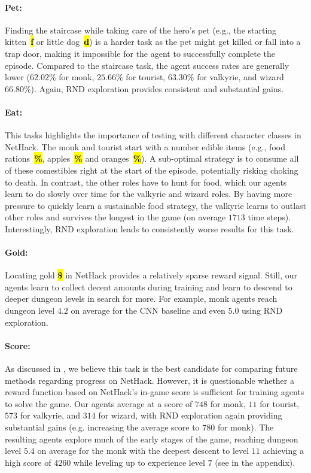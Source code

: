 \documentclass{article}
\newcommand{\nethack}{NetHack}
\newcommand{\LittleDog}{{\bf\ttfamily\color{nethack_white}\sethlcolor{black}\hl{d}}}
\newcommand{\Kitten}{{\bf\ttfamily\color{nethack_white}\sethlcolor{black}\hl{f}}}
\newcommand{\Gold}{{\bf\ttfamily\color{nethack_light_yellow}\sethlcolor{black}\hl{\$}}}
\newcommand{\Food}{{\bf\ttfamily\color{nethack_yellow}\sethlcolor{black}\hl{\%}}}
\newcommand{\Apple}{{\bf\ttfamily\color{nethack_green}\sethlcolor{black}\hl{\%}}}
\newcommand{\Orange}{{\bf\ttfamily\color{nethack_orange}\sethlcolor{black}\hl{\%}}}
\begin{document}
\paragraph{Pet:}
Finding the staircase while taking care of the hero's pet (e.g., the starting kitten~\Kitten{} or little dog~\LittleDog{}) is a harder task as the pet might get killed or fall into a
trap door, making it impossible for the agent to successfully complete the episode.
Compared to the staircase task, the agent success rates are generally lower ($62.02\%$ for monk, $25.66\%$ for tourist, $63.30\%$ for valkyrie, and wizard $66.80\%$). Again, RND exploration provides consistent and substantial gains.

\paragraph{Eat:}
This tasks highlights the importance of testing with different
character classes in \nethack{}.  The monk and tourist start with a number edible items (e.g., food rations~\Food{}, apples~\Apple{} and oranges~\Orange{}).  A sub-optimal strategy is to consume all of these
comestibles right at the start of the episode, potentially risking choking to death.  In contrast, the other roles have to hunt for food, which our agents learn to do slowly over time for the valkyrie and wizard roles.
By having more pressure to quickly learn a sustainable
food strategy, the valkyrie learns to outlast other roles and survives the longest in the game (on average $1713$ time steps).
Interestingly, RND exploration leads to consistently worse results for this task.

\paragraph{Gold:}
Locating gold \Gold{} in \nethack{} provides a relatively sparse reward signal. Still, our agents learn to collect decent amounts during training and learn to descend to deeper dungeon levels in search for more. For example, monk agents reach dungeon level $4.2$ on average for the CNN baseline and even $5.0$ using RND exploration.

\paragraph{Score:}
As discussed in , we believe this task is the best candidate for comparing future methods regarding progress on \nethack{}. However, it is questionable whether a reward function based on \nethack{}'s in-game score is sufficient for training agents to solve the game. Our agents average at a score of $748$ for monk, $11$ for tourist, $573$ for valkyrie, and $314$ for wizard, with RND exploration again providing substantial gains (e.g. increasing the average score to $780$ for monk).
The resulting agents explore much of the early stages of the game, reaching dungeon level $5.4$ on average for the monk with the deepest descent to level $11$ achieving a high score of $4260$ while leveling up to experience level $7$ (see  in the appendix).
\end{document}
